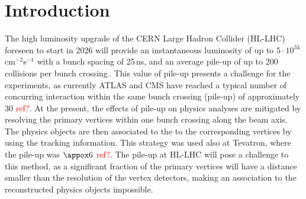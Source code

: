 \documentclass{article}
\begin{document}
\begin{abstract}

\end{abstract}

\clearpage

\tableofcontents

\section{Introduction}

The high luminosity upgrade of the CERN Large Hadron Collider (HL-LHC) foreseen to start in 2026 will provide an instantaneous luminosity of up to $5 \cdot 10^{34}$\,cm$^{-2}$s$^{-1}$ with a bunch spacing of 25\,ns, and an average pile-up of up to 200 collisions per bunch crossing\,\cite{hlLhcTecDesRep}.
This value of pile-up presents a challenge for the experiments, as currently ATLAS and CMS have reached a typical number of concurring interaction within the same bunch crossing (pile-up) of approximately 30 \textcolor{red}{ref?}.
At the present, the effects of pile-up on physics analyses are mitigated by resolving the primary vertices within one bunch crossing along the beam axis.
The physics objects are then associated to the to the corresponding vertices by using the tracking information.
This strategy was used also at Tevatron, where the pile-up was $\appox 6$ \textcolor{red}{ref?}.
The pile-up at HL-LHC will pose a challenge to this method, as a significant fraction of the primary vertices will have a distance smaller than the resolution of the vertex detectors, making an association to the reconstructed physics objects impossible.
\end{document}
